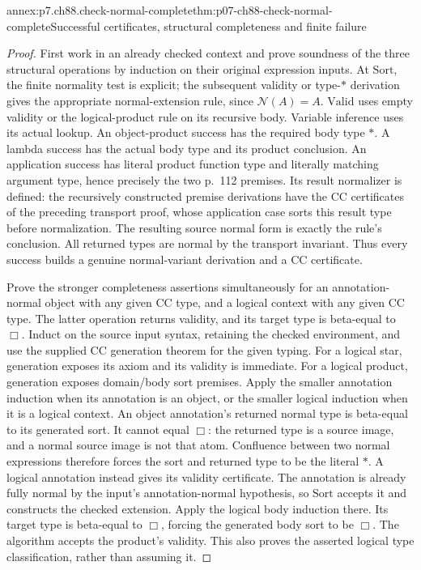 \begin{annexitem}{annex:p7.ch88.check-normal-complete}{thm:p07-ch88-check-normal-complete}{Successful certificates, structural completeness and finite failure}
\begin{proof}
First work in an already checked context and prove soundness of the
three structural operations by induction on their original expression
inputs. At \(\mathrm{Sort}\), the finite normality test is explicit;
the subsequent validity or type-\(\ast\) derivation gives the
appropriate normal-extension rule, since \(\mathcal N(A)=A\).
\(\mathrm{Valid}\) uses empty validity or the logical-product rule
on its recursive body. Variable inference uses its actual lookup.
An object-product success has the required body type \(\ast\).
A lambda success has the actual body type and its product conclusion.
An application success has literal product function type and literally
matching argument type, hence precisely the two p.~112 premises.
Its result normalizer is defined: the recursively constructed premise
derivations have the CC certificates of the preceding transport proof,
whose application case sorts this result type before normalization.
The resulting source normal form is exactly the rule's conclusion.
All returned types are normal by the transport invariant. Thus every
success builds a genuine normal-variant derivation and a CC certificate.

Prove the stronger completeness assertions simultaneously for an
annotation-normal object with any given CC type, and a logical context
with any given CC type. The latter operation returns validity, and
its target type is beta-equal to \(\Box\). Induct on the source
input syntax, retaining the checked environment, and use the supplied
CC generation theorem for the given typing. For a logical star,
generation exposes its axiom and its validity is immediate. For a
logical product, generation exposes domain/body sort premises. Apply
the smaller annotation induction when its annotation is an object,
or the smaller logical induction when it is a logical context.
An object annotation's returned normal type is beta-equal to its
generated sort. It cannot equal \(\Box\): the returned type is
a source image, and a normal source image is not that atom. Confluence
between two normal expressions therefore forces the sort and returned
type to be the literal \(\ast\). A logical annotation instead
gives its validity certificate. The annotation is already fully
normal by the input's annotation-normal hypothesis, so
\(\mathrm{Sort}\) accepts it and constructs the checked extension.
Apply the logical body induction there. Its target type is beta-equal
to \(\Box\), forcing the generated body sort to be \(\Box\).
The algorithm accepts the product's validity. This also proves the
asserted logical type classification, rather than assuming it.


\end{proof}
\end{annexitem}
